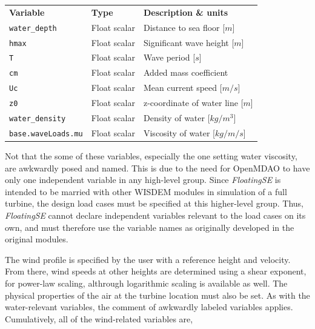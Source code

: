 {\footnotesize
  \begin{tabularx}{\linewidth}{ l l X }
    \textbf{Variable} & \textbf{Type} & \textbf{Description \& units} \\
    \texttt{water\_depth} & Float scalar & Distance to sea floor [$m$]\\
    \texttt{hmax}        & Float scalar & Significant wave height [$m$]\\
    \texttt{T}           & Float scalar & Wave period [$s$]\\
    \texttt{cm}          & Float scalar & Added mass coefficient\\
    \texttt{Uc}          & Float scalar & Mean current speed [$m/s$]\\
    \texttt{z0}          & Float scalar & z-coordinate of water line [$m$]\\
    \texttt{water\_density}      & Float scalar & Density of water [$kg/m^3$]\\
    \texttt{base.waveLoads.mu}  & Float scalar & Viscosity of water [$kg/m/s$]\\
  \end{tabularx}
}

Not that the some of these variables, especially the one setting water
viscosity, are awkwardly posed and named.  This is due
to the need for OpenMDAO to have only one independent variable in any
high-level group.  Since \textit{FloatingSE} is intended to be married
with other WISDEM modules in simulation of a full turbine, the design
load cases must be specified at this higher-level group.  Thus,
\textit{FloatingSE} cannot declare independent variables relevant to the
load cases on its own, and must therefore use the variable names as
originally developed in the original modules.

The wind profile is specified by the user with a reference height and
velocity.  From there, wind speeds at other heights are determined using
a shear exponent, for power-law scaling, althrough logarithmic scaling
is available as well.  The physical properties of the air at the turbine
location must also be set.  As with the water-relevant variables, the
comment of awkwardly labeled variables applies.  Cumulatively, all of
the wind-related variables are,

